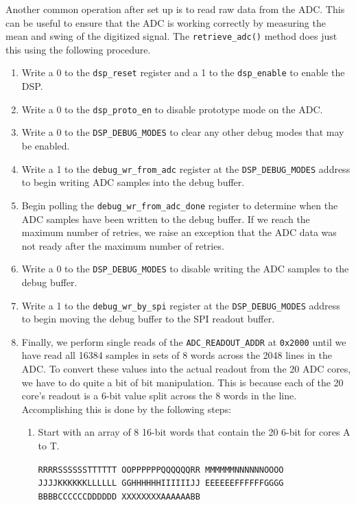 Another common operation after set up is to read raw data from the ADC. 
This can be useful to ensure that the ADC is working correctly by measuring the mean and swing of the digitized signal. 
The \texttt{retrieve\_adc()} method does just this using the following procedure. 
\begin{enumerate}
    \item Write a 0 to the \texttt{dsp\_reset} register and a 1 to the \texttt{dsp\_enable} to enable the DSP.
    \item Write a 0 to the \texttt{dsp\_proto\_en} to disable prototype mode on the ADC.
    \item Write a 0 to the \texttt{DSP\_DEBUG\_MODES} to clear any other debug modes that may be enabled.
    \item Write a 1 to the \texttt{debug\_wr\_from\_adc} register at the \texttt{DSP\_DEBUG\_MODES} address to begin writing ADC samples into the debug buffer. 
    \item Begin polling the \texttt{debug\_wr\_from\_adc\_done} register to determine when the ADC samples have been written to the debug buffer. If we reach the maximum number of retries, we raise an exception that the ADC data was not ready after the maximum number of retries.
    \item Write a 0 to the \texttt{DSP\_DEBUG\_MODES} to disable writing the ADC samples to the debug buffer.
    \item Write a 1 to the \texttt{debug\_wr\_by\_spi} register at the \texttt{DSP\_DEBUG\_MODES} address to begin moving the debug buffer to the SPI readout buffer.
    \item Finally, we perform single reads of the \texttt{ADC\_READOUT\_ADDR} at \texttt{0x2000} until we have read all 16384 samples in sets of 8 words across the 2048 lines in the ADC. 
    To convert these values into the actual readout from the 20 ADC cores, we have to do quite a bit of bit manipulation. 
    This is because each of the 20 core's readout is a 6-bit value split across the 8 words in the line. 
    Accomplishing this is done by the following steps:
    \begin{enumerate}
        \item Start with an array of 8 16-bit words that contain the 20 6-bit for cores A to T. \\
        {\raggedright 
        \texttt{RRRRSSSSSSTTTTTT OOPPPPPPQQQQQQRR MMMMMMNNNNNNOOOO JJJJKKKKKKLLLLLL GGHHHHHHIIIIIIJJ EEEEEEFFFFFFGGGG BBBBCCCCCCDDDDDD XXXXXXXXAAAAAABB}
        \par}

\end{enumerate}
\end{enumerate}
